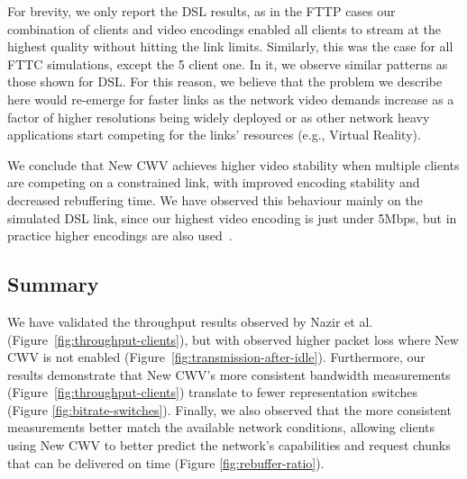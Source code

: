 \documentclass[10pt,sigconf,anonymous]{acmart}
\begin{document}

For brevity, we only report the DSL results, as in the FTTP cases our combination of clients and video encodings enabled all clients to stream at the highest quality without hitting the link limits. Similarly, this was the case for all FTTC simulations, except the 5 client one. In it, we observe similar patterns as those shown for DSL. For this reason, we believe that the problem we describe here would re-emerge for faster links as the network video demands increase as a factor of higher resolutions being widely deployed or as other network heavy applications start competing for the links' resources (e.g., Virtual Reality).

We conclude that New CWV achieves higher video stability when multiple clients are competing on a constrained link, with improved encoding stability and decreased rebuffering time. We have observed this behaviour mainly on the simulated DSL link, since our highest video encoding is just under 5Mbps, but in practice higher encodings are also used~\cite{online-youtube-encodings}.


\subsection{Summary}
\label{sec:summary}

We have validated the throughput results observed by Nazir et al.~\cite{Nazir-2014-performance-evaluation-congestion-window-validation-dash-newcwv} (Figure~\ref{fig:throughput-clients}), but with observed higher packet loss where New CWV is not enabled (Figure~\ref{fig:transmission-after-idle}). Furthermore, our results demonstrate that New CWV's more consistent bandwidth measurements (Figure~\ref{fig:throughput-clients}) translate to fewer representation switches (Figure \ref{fig:bitrate-switches}). Finally, we also observed that the more consistent measurements better match the available network conditions, allowing clients using New CWV to better predict the network's capabilities and request chunks that can be delivered on time (Figure \ref{fig:rebuffer-ratio}).
\end{document}
